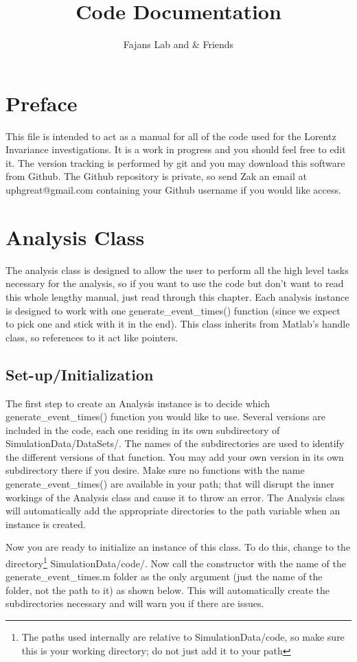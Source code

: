 \documentclass[12pt]{report}
\author{Fajans Lab and \& Friends}
\title{Code Documentation}
\begin{document}
\maketitle

\chapter*{Preface}
This file is intended to act as a manual for all of the code used for the Lorentz Invariance investigations.  It is a work in progress and you should feel free to edit it.  The version tracking is performed by git and you may download this software from Github.  The Github repository is private, so send Zak an email at uphgreat@gmail.com containing your Github username if you would like access.

\tableofcontents



\chapter{Analysis Class}
The analysis class is designed to allow the user to perform all the high level tasks necessary for the analysis, so if you want to use the code but don't want to read this whole lengthy manual, just read through this chapter.  Each analysis instance is designed to work with one generate\_event\_times() function (since we expect to pick one and stick with it in the end).  This class inherits from Matlab's handle class, so references to it act like pointers.

\section{Set-up/Initialization}
The first step to create an Analysis instance is to decide which generate\_event\_times() function you would like to use.  Several versions are included in the code, each one residing in its own subdirectory of SimulationData/DataSets/.  The names of the subdirectories are used to identify the different versions of that function.  You may add your own version in its own subdirectory there if you desire.  Make sure no functions with the name generate\_event\_times() are available in your path; that will disrupt the inner workings of the Analysis class and cause it to throw an error.  The Analysis class will automatically add the appropriate directories to the path variable when an instance is created.

Now you are ready to initialize an instance of this class.  To do this, change to the directory\footnote{The paths used internally are relative to SimulationData/code, so make sure this is your working directory; do not just add it to your path} SimulationData/code/.  Now call the constructor with the name of the generate\_event\_times.m folder as the only argument (just the name of the folder, not the path to it) as shown below.  This will automatically create the subdirectories necessary and will warn you if there are issues.
\end{document}
